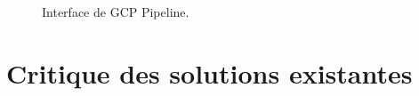 \begin{figure}[H]
  \begin{center}
  

  \end{center}
  
  \caption{Interface de GCP Pipeline.}
\end{figure}
\section{\selectfont\Large Critique des solutions existantes}


